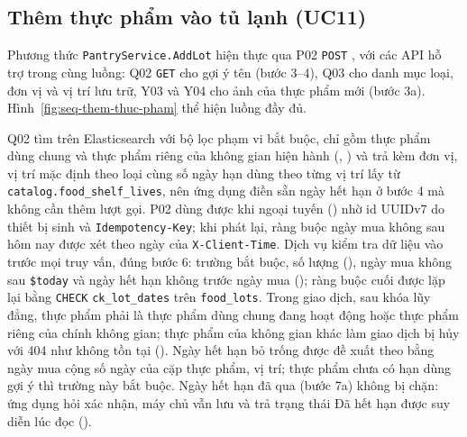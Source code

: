 \subsection{Thêm thực phẩm vào tủ lạnh (UC11)}\label{sssec:ht-them-thuc-pham}

Phương thức \texttt{PantryService.AddLot} hiện thực  qua P02 \texttt{POST} , với các API hỗ trợ trong cùng luồng: Q02 \texttt{GET}  cho gợi ý tên (bước 3--4), Q03 cho danh mục loại, đơn vị và vị trí lưu trữ, Y03 và Y04 cho ảnh của thực phẩm mới (bước 3a). Hình~\ref{fig:seq-them-thuc-pham} thể hiện luồng đầy đủ.


Q02 tìm trên Elasticsearch với bộ lọc phạm vi bắt buộc, chỉ gồm thực phẩm dùng chung và thực phẩm riêng của không gian hiện hành (, ) và trả kèm đơn vị, vị trí mặc định theo loại cùng số ngày hạn dùng theo từng vị trí lấy từ \texttt{catalog.food\_shelf\_lives}, nên ứng dụng điền sẵn ngày hết hạn ở bước 4 mà không cần thêm lượt gọi. P02 dùng được khi ngoại tuyến () nhờ id UUIDv7 do thiết bị sinh và \texttt{Idempotency-Key}; khi phát lại, ràng buộc ngày mua không sau hôm nay được xét theo ngày của \texttt{X-Client-Time}. Dịch vụ kiểm tra dữ liệu vào trước mọi truy vấn, đúng bước 6: trường bắt buộc, số lượng (), ngày mua không sau \texttt{\$today} và ngày hết hạn không trước ngày mua (); ràng buộc cuối được lặp lại bằng \texttt{CHECK} \texttt{ck\_lot\_dates} trên \texttt{food\_lots}. Trong giao dịch, sau khóa lũy đẳng, thực phẩm phải là thực phẩm dùng chung đang hoạt động hoặc thực phẩm riêng của chính không gian; thực phẩm của không gian khác làm giao dịch bị hủy với 404 như không tồn tại (). Ngày hết hạn bỏ trống được đề xuất theo  bằng ngày mua cộng số ngày của cặp thực phẩm, vị trí; thực phẩm chưa có hạn dùng gợi ý thì trường này bắt buộc. Ngày hết hạn đã qua (bước 7a) không bị chặn: ứng dụng hỏi xác nhận, máy chủ vẫn lưu và trả trạng thái Đã hết hạn được suy diễn lúc đọc ().

